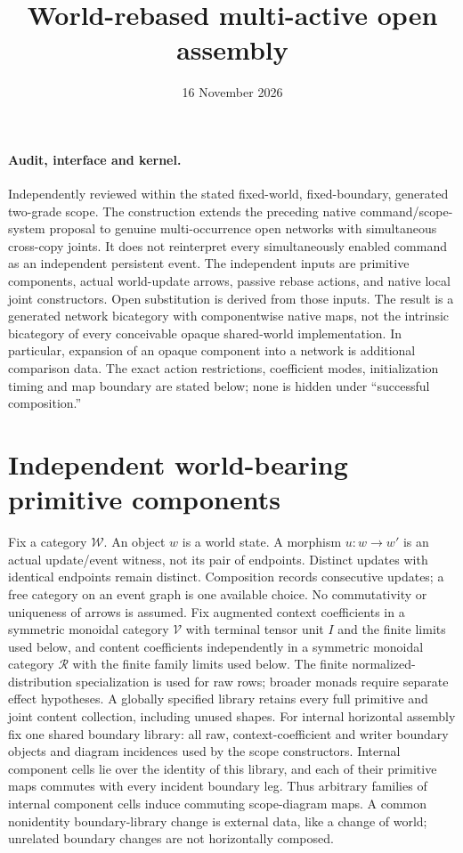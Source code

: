 \documentclass[11pt]{article}
\title{World-rebased multi-active open assembly}
\date{16 November 2026}
\begin{document}
\maketitle
\paragraph{Audit, interface and kernel.}
Independently reviewed within the stated fixed-world, fixed-boundary, generated two-grade scope. The construction extends the preceding native command/scope-system proposal to genuine multi-occurrence open networks with simultaneous cross-copy joints. It does not reinterpret every simultaneously enabled command as an independent persistent event. The independent inputs are primitive components, actual world-update arrows, passive rebase actions, and native local joint constructors. Open substitution is derived from those inputs. The result is a generated network bicategory with componentwise native maps, not the intrinsic bicategory of every conceivable opaque shared-world implementation. In particular, expansion of an opaque component into a network is additional comparison data. The exact action restrictions, coefficient modes, initialization timing and map boundary are stated below; none is hidden under ``successful composition.''

\section{Independent world-bearing primitive components}
Fix a category $\mathcal W$. An object $w$ is a world state. A morphism $u:w\to w'$ is an actual update/event witness, not its pair of endpoints. Distinct updates with identical endpoints remain distinct. Composition records consecutive updates; a free category on an event graph is one available choice. No commutativity or uniqueness of arrows is assumed. Fix augmented context coefficients in a symmetric monoidal category $\mathcal V$ with terminal tensor unit $I$ and the finite limits used below, and content coefficients independently in a symmetric monoidal category $\mathcal R$ with the finite family limits used below. The finite normalized-distribution specialization is used for raw rows; broader monads require separate effect hypotheses. A globally specified library retains every full primitive and joint content collection, including unused shapes. For internal horizontal assembly fix one shared boundary library: all raw, context-coefficient and writer boundary objects and diagram incidences used by the scope constructors. Internal component cells lie over the identity of this library, and each of their primitive maps commutes with every incident boundary leg. Thus arbitrary families of internal component cells induce commuting scope-diagram maps. A common nonidentity boundary-library change is external data, like a change of world; unrelated boundary changes are not horizontally composed.
\end{document}
